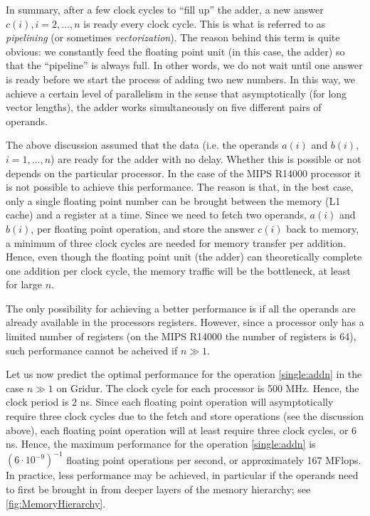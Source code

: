 In summary, after a few clock cycles to ``fill up'' the adder, a new answer
$c(i), i=2,\ldots,n$ is ready every clock cycle. This is what is referred to as
\emph{pipelining} (or sometimes \emph{vectorization}). The reason behind this
term is quite obvious: we constantly feed the floating point unit (in this case,
the adder) so that the ``pipeline'' is always full. In other words, we do not
wait until one answer is ready before we start the process of adding two new
numbers. In this way, we achieve a certain level of parallelism in the sense
that asymptotically (for long vector lengths), the adder works simultaneously on
five different pairs of operands.

The above discussion assumed that the data (i.e. the operands $a(i)$ and $b(i)$,
$i=1,\ldots,n$) are ready for the adder with no delay. Whether this is possible
or not depends on the particular processor. In the case of the MIPS R14000
processor it is not possible to achieve this performance. The reason is that,
in the best case, only a single floating point number can be brought between the
memory (L1 cache) and a register at a time. Since we need to fetch two operands,
$a(i)$ and $b(i)$, per floating point operation, and store the answer $c(i)$
back to memory, a minimum of three clock cycles are needed for memory transfer
per addition. Hence, even though the floating point unit (the adder) can
theoretically complete one addition per clock cycle, the memory traffic will be
the bottleneck, at least for large $n$.

The only possibility for achieving a better performance is if all the operands
are already available in the processors registers. However, since a processor
only has a limited number of registers (on the MIPS R14000 the number of
registers is 64), such performance cannot be acheived if $n \gg 1$.

Let us now predict the optimal performance for the operation \eqref{single:addn}
in the case $n \gg 1$ on Gridur. The clock cycle for each processor is 500 MHz.
Hence, the clock period is 2 ns. Since each floating point operation will
asymptotically require three clock cycles due to the fetch and store operations
(see the discussion above), each floating point operation will at least require
three clock cycles, or 6 ns. Hence, the maximum performance for the operation
\eqref{single:addn} is $(6\cdot 10^{-9})^{-1}$ floating point operations per
second, or approximately 167 MFlops. In practice, less performance may be
achieved, in particular if the operands need to first be brought in from deeper
layers of the memory hierarchy; see \autoref{fig:MemoryHierarchy}.

